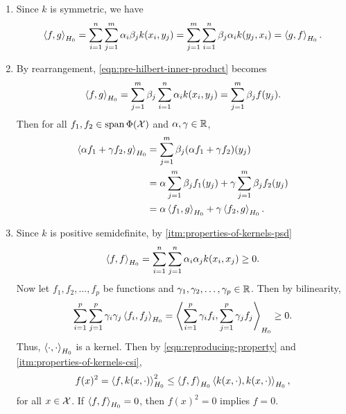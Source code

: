 \begin{enumerate}
    \item Since \(k\) is symmetric, we have
    \begin{equation}
        \left\langle f, g \right\rangle_{H_0}
        = \sum_{i=1}^{n} \sum_{j=1}^{m} \alpha_i \beta_j k(x_i, y_j)
        = \sum_{j=1}^{m} \sum_{i=1}^{n} \beta_j \alpha_i k(y_j, x_i)
        = \left\langle g, f \right\rangle_{H_0}.
    \end{equation}
    \item By rearrangement, \cref{eqn:pre-hilbert-inner-product} becomes
    \begin{equation}
        \left\langle f, g \right\rangle_{H_0}
        = \sum_{j=1}^{m} \beta_j \sum_{i=1}^{n} \alpha_i k(x_i, y_j)
        = \sum_{j=1}^{m} \beta_j f(y_j).
    \end{equation}
    Then for all \(f_1, f_2 \in \operatorname{span} \Phi(\mathcal{X})\) and \(\alpha, \gamma \in \mathbb{R}\),
    \begin{align}
            \left\langle \alpha f_1 + \gamma f_2, g \right\rangle_{H_0}
            &= \sum_{j=1}^{m} \beta_j (\alpha f_1 + \gamma f_2)(y_j) \\
            &= \alpha \sum_{j=1}^{m} \beta_j f_1(y_j) + \gamma \sum_{j=1}^{m} \beta_j f_2(y_j)
            \notag\\
            &= \alpha \left\langle f_1, g \right\rangle_{H_0} + \gamma \left\langle f_2, g \right\rangle_{H_0}.
            \notag
    \end{align}
    \item Since \(k\) is positive semidefinite, by  \cref{itm:properties-of-kernels-psd}
    \begin{equation}
        \left\langle f,f \right\rangle_{H_0}
        = \sum_{i=1}^{n} \sum_{j=1}^{n} \alpha_i \alpha_j k(x_i, x_j)
        \geq 0.
    \end{equation}
    Now let \(f_1, f_2, \dots, f_p\) be functions and \(\gamma_1, \gamma_2, \dots, \gamma_p \in \mathbb{R}\).
    Then by bilinearity,
    \begin{equation}
        \sum_{i=1}^{p} \sum_{j=1}^{p} \gamma_i \gamma_j \left\langle f_i, f_j \right\rangle_{H_0}
        = \left\langle \sum_{i=1}^{p} \gamma_i f_i, \sum_{j=1}^{p} \gamma_j f_j \right\rangle_{H_0}
        \geq 0.
    \end{equation}
    Thus, \(\left\langle \cdot, \cdot \right\rangle_{H_0}\) is a kernel.
    Then by \cref{eqn:reproducing-property} and  \cref{itm:properties-of-kernels-csi},
    \begin{equation}
        f(x)^2 = \left\langle f, k(x, \cdot) \right\rangle_{H_0}^2 \leq \left\langle f,f \right\rangle_{H_0} \left\langle k(x, \cdot), k(x, \cdot) \right\rangle_{H_0},
    \end{equation}
    for all \(x \in \mathcal{X}\).
    If \(\left\langle f,f \right\rangle_{H_0} = 0\), then \(f(x)^2 = 0\) implies \(f = 0\).
\end{enumerate}

